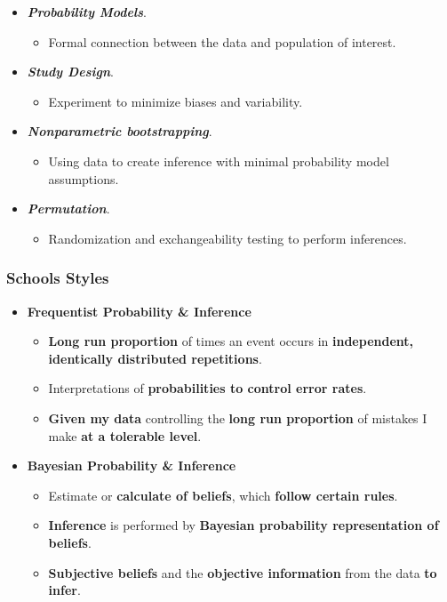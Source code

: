 \documentclass[10pt,article]{article}
\begin{document}
\begin{itemize}
\item \textbf{\emph{Probability Models}}.
\begin{itemize}
\item Formal connection between the data and population of interest.
\end{itemize}

\item \textbf{\emph{Study Design}}.
\begin{itemize}
\item Experiment to minimize biases and variability.
\end{itemize}

\item \textbf{\emph{Nonparametric bootstrapping}}.
\begin{itemize}
\item Using data to create inference with minimal probability model assumptions.
\end{itemize}

\item \textbf{\emph{Permutation}}.
\begin{itemize}
\item Randomization and exchangeability testing to perform inferences.
\end{itemize}
\end{itemize}

\subsubsection{Schools Styles}
\label{sec:orgf0a3e02}
\begin{itemize}
\item \textbf{{\color{green}Frequentist} Probability \& Inference}
\begin{itemize}
\item \textbf{Long run proportion} of times an event occurs in \textbf{independent, identically distributed repetitions}.
\item Interpretations of \textbf{probabilities to control error rates}.
\item \textbf{Given my data} controlling the \textbf{long run proportion} of mistakes I make \textbf{at a tolerable level}.
\end{itemize}
\end{itemize}
\begin{itemize}
\item \textbf{{\color{green}Bayesian} Probability \& Inference}
\begin{itemize}
\item Estimate or \textbf{calculate of beliefs}, which \textbf{follow certain rules}.
\item \textbf{Inference} is performed by \textbf{Bayesian probability representation of beliefs}.
\item \textbf{Subjective beliefs} and the \textbf{objective information} from the data \textbf{to infer}.
\end{itemize}
\end{itemize}
\end{document}
